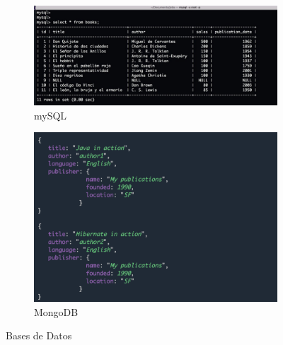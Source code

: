 \begin{figure}[H]
  \begin{subfigure}[b]{0.5\textwidth}
  \centering
    \includegraphics[width=1\textwidth, height=0.7\textwidth]{chapters/images/mysql.png}
    \caption{mySQL}
    \label{fig:f1}
  \end{subfigure}
  \hfill
  \begin{subfigure}[b]{0.5\textwidth}
  \centering
    \includegraphics[width=1\textwidth, height=0.7\textwidth]{chapters/images/mongodb.png}
    \caption{MongoDB}
    \label{fig:f2}
  \end{subfigure}
  \caption{Bases de Datos}
\end{figure}



\newpage
